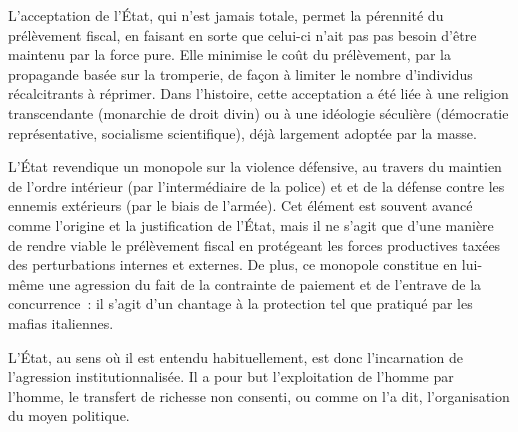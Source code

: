 L'acceptation de l'État, qui n'est jamais totale, permet la pérennité du prélèvement fiscal, en faisant en sorte que celui-ci n'ait pas pas besoin d'être maintenu par la force pure. Elle minimise le coût du prélèvement, par la propagande basée sur la tromperie, de façon à limiter le nombre d'individus récalcitrants à réprimer. Dans l'histoire, cette acceptation a été liée à une religion transcendante (monarchie de droit divin) ou à une idéologie séculière (démocratie représentative, socialisme scientifique), déjà largement adoptée par la masse. %

L'État revendique un monopole sur la violence défensive, au travers du maintien de l'ordre intérieur (par l'intermédiaire de la police) et et de la défense contre les ennemis extérieurs (par le biais de l'armée). Cet élément est souvent avancé comme l'origine et la justification de l'État, mais il ne s'agit que d'une manière de rendre viable le prélèvement fiscal en protégeant les forces productives taxées des perturbations internes et externes. De plus, ce monopole constitue en lui-même une agression du fait de la contrainte de paiement et de l'entrave de la concurrence~: il s'agit d'un chantage à la protection tel que pratiqué par les mafias italiennes.

L'État, au sens où il est entendu habituellement, est donc l'incarnation de l'agression institutionnalisée. Il a pour but l'exploitation de l'homme par l'homme, le transfert de richesse non consenti, ou comme on l'a dit, l'organisation du moyen politique.

